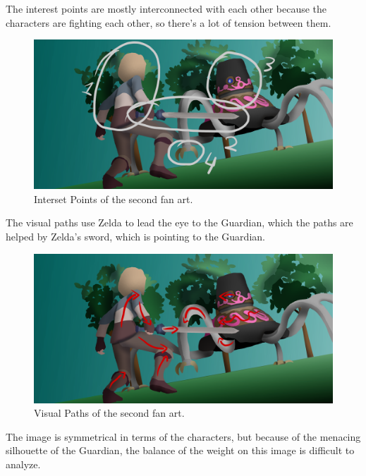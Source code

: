 \documentclass{cup-pan}
\begin{document}
            The interest points are mostly interconnected with each other because the characters are fighting each other, so there's a lot of tension between them.\\
            \begin{figure}[H]
                \includegraphics[width=\textwidth]{Imagenes/Fanart2/Analysis/puntos_interes.png}
                \caption{Interset Points of the second fan art.}
            \end{figure}

            The visual paths use Zelda to lead the eye to the Guardian, which the paths are helped by Zelda's sword, which is pointing to the Guardian.\\
            \begin{figure}[H]
                \includegraphics[width=\textwidth]{Imagenes/Fanart2/Analysis/recorridos.png}
                \caption{Visual Paths of the second fan art.}
            \end{figure}

            The image is symmetrical in terms of the characters, but because of the menacing silhouette of the Guardian, the balance of the weight on this image is difficult to analyze.\\
\end{document}
